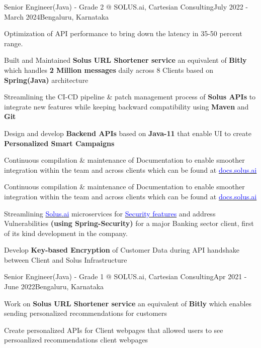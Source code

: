 \documentclass[
	a4paper, %
	12pt, %
]{resume} %
\begin{document}
\begin{rSubsection}{Senior Engineer(Java) - Grade 2 @ SOLUS.ai, Cartesian Consulting}{July  2022 - March 2024}{}{Bengaluru, Karnataka}
		\setlength{\itemsep}{0.01em}
		\item Optimization of API performance to bring down the latency in 35-50 percent range.
		\item Built and Maintained \textbf{Solus URL Shortener service} an equivalent of \textbf{Bitly} which handles \textbf{2 Million messages} daily across 8 Clients based on \textbf{Spring(Java)} architecture
		\item Streamlining the CI-CD pipeline \& patch management process of \textbf{Solus APIs} to integrate new features while keeping backward compatibility using \textbf{Maven} and \textbf{Git}
		\item Design and develop \textbf{Backend APIs} based on \textbf{Java-11} that enable UI to create \textbf{ Personalized Smart Campaigns}
		\item Continuous compilation \& maintenance of Documentation to enable smoother integration within the team and across clients which  can be found at \href{https://docs.solus.ai/docs/category/apis}{\textcolor{blue}{docs.solus.ai}}
		\item Continuous compilation \& maintenance of Documentation to enable smoother integration within the team and across clients which  can be found at \href{https://docs.solus.ai/docs/category/apis}{\textcolor{blue}{docs.solus.ai}}
		\item Streamlining \href{https://docs.solus.ai/docs/category/security-features}{\textcolor{blue}{Solus.ai}} microservices for  \href{https://docs.solus.ai/docs/category/security-features}{\textcolor{blue}{Security features}} and address Vulnerabilities \textbf{(using Spring-Security)} for a major Banking sector client, first of its kind development in the company.
		\item Develop \textbf{Key-based Encryption} of Customer Data during API handshake between Client and Solus Infrastructure
	\end{rSubsection}

	\begin{rSubsection}{Senior Engineer(Java) - Grade 1 @ SOLUS.ai, Cartesian Consulting}{Apr 2021 - June 2022}{}{Bengaluru, Karnataka}
		\setlength{\itemsep}{0.01em}
		\item Work on \textbf{Solus URL Shortener service} an equivalent of \textbf{Bitly} which enables sending personalized recommendations for customers  
		\item Create personalized APIs for Client webpages that allowed users to see persoanlized recommendations client webpages 
	\end{rSubsection}
\end{document}
